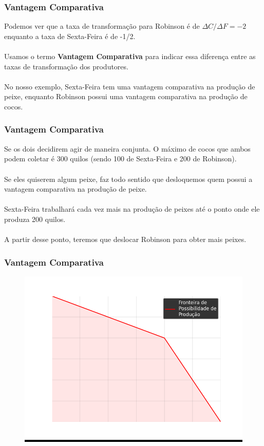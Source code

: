 \documentclass{beamer}[10]
\begin{document}
\begin{frame}
	\frametitle{Vantagem Comparativa}

	Podemos ver que a taxa de transformação para Robinson é de $\Delta C / \Delta F = -2$ enquanto a taxa de Sexta-Feira é de -1/2.
	\\~\\
	Usamos o termo \textbf{Vantagem Comparativa} para indicar essa diferença entre as taxas de transformação dos produtores.
	\\~\\
	No nosso exemplo, Sexta-Feira tem uma vantagem comparativa na produção de peixe, enquanto Robinson possui uma vantagem comparativa na produção de cocos.

\end{frame}

\begin{frame}
	\frametitle{Vantagem Comparativa}

	Se os dois decidirem agir de maneira conjunta. O máximo de cocos que ambos podem coletar é 300 quilos (sendo 100 de Sexta-Feira e 200 de Robinson).
	\\~\\
	Se eles quiserem algum peixe, faz todo sentido que desloquemos quem possui a vantagem comparativa na produção de peixe.
	\\~\\
	Sexta-Feira trabalhará cada vez mais na produção de peixes até o ponto onde ele produza 200 quilos.
	\\~\\
	A partir desse ponto, teremos que deslocar Robinson para obter mais peixes.

\end{frame}

\begin{frame}
	\frametitle{Vantagem Comparativa}

	\begin{figure}[H]
		\centering
		\colorbox{black}{\includegraphics[scale=0.6]{cap33_10-pos_prod2.png}}
	\end{figure}

\end{frame}
\end{document}
